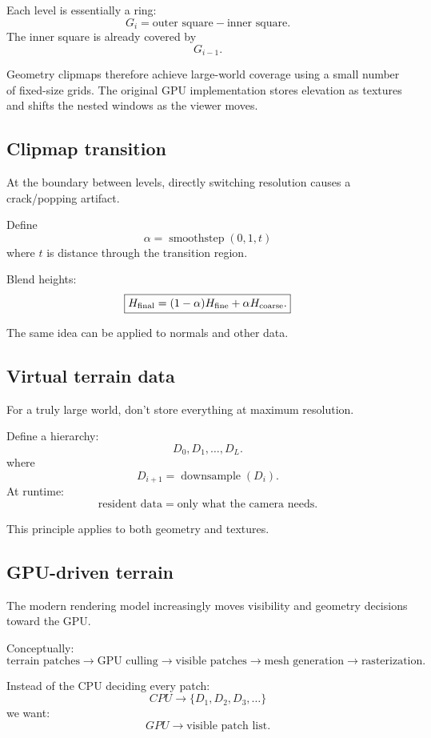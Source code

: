 \documentclass[12pt]{article}
\begin{document}
	Each level is essentially a ring:
	\[
	G_i= \text{outer square} - \text{inner square}.
	\]
	The inner square is already covered by
	\[
	G_{i-1}.
	\]
	
	Geometry clipmaps therefore achieve large-world coverage using a small number of fixed-size grids. The original GPU implementation stores elevation as textures and shifts the nested windows as the viewer moves.
	
	\subsection{Clipmap transition}
	
	At the boundary between levels, directly switching resolution causes a crack/popping artifact.
	
	Define
	\[
	\alpha= \operatorname{smoothstep}(0,1,t)
	\]
	where $t$ is distance through the transition region.
	
	Blend heights:
	\[
	\boxed{
		H_{\rm final}= (1-\alpha)H_{\rm fine} + \alpha H_{\rm coarse}.
	}
	\]
	
	The same idea can be applied to normals and other data.
	
	\subsection{Virtual terrain data}
	
	For a truly large world, don't store everything at maximum resolution.
	
	Define a hierarchy:
	\[
	D_0,D_1,\ldots,D_L.
	\]
	where
	\[
	D_{i+1}= \operatorname{downsample}(D_i).
	\]
	At runtime:
	\[
	\boxed{
		\text{resident data} = \text{only what the camera needs}.
	}
	\]
	
	This principle applies to both geometry and textures.
	
	\subsection{GPU-driven terrain}
	
	The modern rendering model increasingly moves visibility and geometry decisions toward the GPU.
	
	Conceptually:
	\[
	\text{terrain patches} \rightarrow \text{GPU culling} \rightarrow \text{visible patches} \rightarrow \text{mesh generation} \rightarrow \text{rasterization}.
	\]
	
	Instead of the CPU deciding every patch:
	\[
	CPU \rightarrow \{D_1,D_2,D_3,\ldots\}
	\]
	we want:
	\[
	\boxed{
		GPU \rightarrow \text{visible patch list}.
	}
	\]
	
\end{document}
